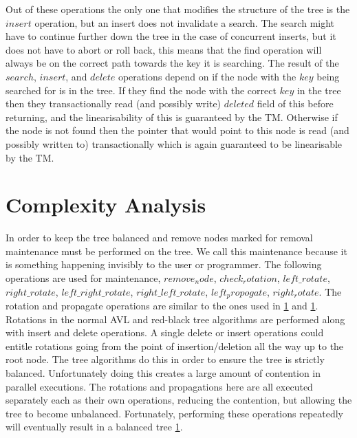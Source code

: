 \documentclass[10pt]{sigplanconf}
\begin{document}
Out of these operations the only one that modifies the structure of the tree is the $insert$ operation, but an insert does not invalidate a search.
The search might have to continue further down the tree in the case of concurrent inserts, but it does not have to abort or roll back, this means that the find operation will always be on the correct path towards the key it is searching.
The result of the $search$, $insert$, and $delete$ operations depend on if the node with the $key$ being searched for is in the tree.
If they find the node with the correct $key$ in the tree then they transactionally read (and possibly write) $deleted$ field of this before returning, and the linearisability of this is guaranteed by the TM.
Otherwise if the node is not found then the pointer that would point to this node is read (and possibly written to) transactionally which is again guaranteed to be linearisable by the TM.


\section{Complexity Analysis}

In order to keep the tree balanced and remove nodes marked for removal maintenance must be performed on the tree.
We call this maintenance because it is something happening invisibly to the user or programmer.
The following operations are used for maintenance, $remove_node$, $check_rotation$, $left\_rotate$, $right\_rotate$, $left\_right\_rotate$, $right\_left\_rotate$, $left_propogate$, $right_rotate$.
The rotation and propagate operations are similar to the ones used in \ref{} and \ref{}.
Rotations in the normal AVL and red-black tree algorithms are performed along with insert and delete operations.
A single delete or insert operations could entitle rotations going from the point of insertion/deletion all the way up to the root node.
The tree algorithms do this in order to ensure the tree is strictly balanced.
Unfortunately doing this creates a large amount of contention in parallel executions.
The rotations and propagations here are all executed separately each as their own operations, reducing the contention, but allowing the tree to become unbalanced.
Fortunately, performing these operations repeatedly will eventually result in a balanced tree \ref{}.
\end{document}
